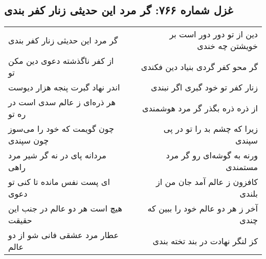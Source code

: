 \begin{center}
\section*{غزل شماره ۷۶۶: گر مرد این حدیثی زنار کفر بندی}
\label{sec:766}
\begin{longtable}{l p{0.5cm} r}
گر مرد این حدیثی زنار کفر بندی
&&
دین از تو دور دور است بر خویشتن چه خندی
\\
از کفر ناگذشته دعوی دین مکن تو
&&
گر محو کفر گردی بنیاد دین فکندی
\\
اندر نهاد گبرت پنجه هزار دیوست
&&
زنار کفر تو خود گبری اگر نبندی
\\
هر ذره‌ای ز عالم سدی است در ره تو
&&
از ذره ذره بگذر گر مرد هوشمندی
\\
چون گویمت که خود را می‌سوز چون سپندی
&&
زیرا که چشم بد را تو در پی سپندی
\\
مردانه پای در نه گر شیر مرد راهی
&&
ورنه به گوشه‌ای رو گر مرد مستمندی
\\
ای پست نفس مانده تا کنی تو دعوی
&&
کافزون ز عالم آمد جان من از بلندی
\\
هیچ است هر دو عالم در جنب این حقیقت
&&
آخر ز هر دو عالم خود را ببین که چندی
\\
عطار مرد عشقی فانی شو از دو عالم
&&
کز لنگر نهادت در بند تخته بندی
\\
\end{longtable}
\end{center}

